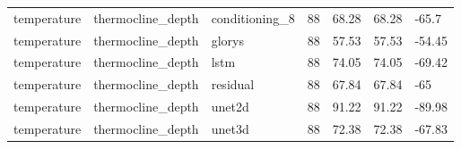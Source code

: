\begin{table}[htbp]
\begin{tabular}{lllllll}
temperature & thermocline\_depth & conditioning\_8 & 88 & 68.28 & 68.28 & -65.7 \\
temperature & thermocline\_depth & glorys & 88 & 57.53 & 57.53 & -54.45 \\
temperature & thermocline\_depth & lstm & 88 & 74.05 & 74.05 & -69.42 \\
temperature & thermocline\_depth & residual & 88 & 67.84 & 67.84 & -65 \\
temperature & thermocline\_depth & unet2d & 88 & 91.22 & 91.22 & -89.98 \\
temperature & thermocline\_depth & unet3d & 88 & 72.38 & 72.38 & -67.83 \\
\bottomrule
\end{tabular}
\end{table}
